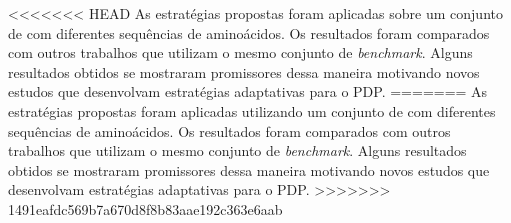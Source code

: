 \begin{resumo}
<<<<<<< HEAD
 As estratégias propostas foram aplicadas sobre um conjunto de  com diferentes sequências de aminoácidos. Os resultados foram comparados com outros trabalhos que utilizam o mesmo conjunto de \textit{benchmark}. Alguns resultados obtidos se mostraram promissores dessa maneira motivando novos estudos que desenvolvam estratégias adaptativas para o PDP.
=======
 As estratégias propostas foram aplicadas utilizando um conjunto de  com diferentes sequências de aminoácidos. Os resultados foram comparados com outros trabalhos que utilizam o mesmo conjunto de \textit{benchmark}. Alguns resultados obtidos se mostraram promissores dessa maneira motivando novos estudos que desenvolvam estratégias adaptativas para o PDP.
>>>>>>> 1491eafdc569b7a670d8f8b83aae192c363e6aab



\end{resumo}


